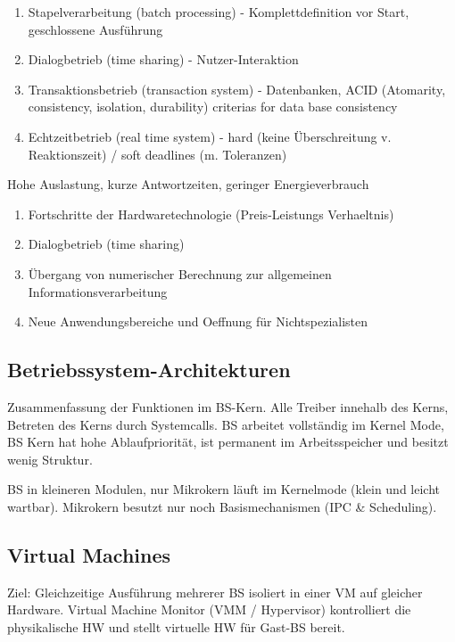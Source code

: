 \begin{enumerate}
	\setlength\itemsep{0em}
	\item Stapelverarbeitung (batch processing) - Komplettdefinition vor Start, geschlossene Ausführung
	\item Dialogbetrieb (time sharing) - Nutzer-Interaktion
	\item Transaktionsbetrieb (transaction system) - Datenbanken, ACID (Atomarity, consistency, isolation, durability) criterias for data base consistency
	\item Echtzeitbetrieb (real time system) - hard (keine Überschreitung v. Reaktionszeit) / soft deadlines (m. Toleranzen)
\end{enumerate}

Hohe Auslastung, kurze Antwortzeiten, geringer Energieverbrauch 

\begin{enumerate}
	\setlength\itemsep{0em}
	\item Fortschritte der Hardwaretechnologie (Preis-Leistungs Verhaeltnis)
	\item Dialogbetrieb (time sharing)
	\item Übergang von numerischer Berechnung zur allgemeinen Informationsverarbeitung
	\item Neue Anwendungsbereiche und Oeffnung für Nichtspezialisten 
\end{enumerate}

\subsection{Betriebssystem-Architekturen}
Zusammenfassung der Funktionen im BS-Kern. Alle Treiber innehalb des Kerns, Betreten des Kerns durch Systemcalls. BS arbeitet vollständig im Kernel Mode, BS Kern hat hohe Ablaufpriorität, ist permanent im Arbeitsspeicher und besitzt wenig Struktur. 

BS in kleineren Modulen, nur Mikrokern läuft im Kernelmode (klein und leicht wartbar). Mikrokern besutzt nur noch Basismechanismen (IPC \& Scheduling). 

\subsection{Virtual Machines}
Ziel: Gleichzeitige Ausführung mehrerer BS isoliert in einer VM auf gleicher Hardware. Virtual Machine Monitor (VMM / Hypervisor) kontrolliert die physikalische HW und stellt virtuelle HW für Gast-BS bereit. 

